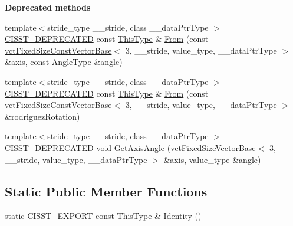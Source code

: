 \begin{Indent}{\bf Deprecated methods}\par
\begin{DoxyCompactItemize}
\item 
{\footnotesize template$<$stride\+\_\+type \+\_\+\+\_\+stride, class \+\_\+\+\_\+data\+Ptr\+Type $>$ }\\\hyperlink{cmn_portability_8h_a63da7164735f9501be651b1f2bbc0121}{C\+I\+S\+S\+T\+\_\+\+D\+E\+P\+R\+E\+C\+A\+T\+E\+D} const \hyperlink{classvct_quaternion_base_af28efdc38acf89acb7a67afada11408c}{This\+Type} \& \hyperlink{classvct_quaternion_rotation3_base_a2a79d881d43dd7b77a1e428d80060dba}{From} (const \hyperlink{classvct_fixed_size_const_vector_base}{vct\+Fixed\+Size\+Const\+Vector\+Base}$<$ 3, \+\_\+\+\_\+stride, value\+\_\+type, \+\_\+\+\_\+data\+Ptr\+Type $>$ \&axis, const Angle\+Type \&angle)
\item 
{\footnotesize template$<$stride\+\_\+type \+\_\+\+\_\+stride, class \+\_\+\+\_\+data\+Ptr\+Type $>$ }\\\hyperlink{cmn_portability_8h_a63da7164735f9501be651b1f2bbc0121}{C\+I\+S\+S\+T\+\_\+\+D\+E\+P\+R\+E\+C\+A\+T\+E\+D} const \hyperlink{classvct_quaternion_base_af28efdc38acf89acb7a67afada11408c}{This\+Type} \& \hyperlink{classvct_quaternion_rotation3_base_a2e5b033f5656aed1877476b90b332ecb}{From} (const \hyperlink{classvct_fixed_size_const_vector_base}{vct\+Fixed\+Size\+Const\+Vector\+Base}$<$ 3, \+\_\+\+\_\+stride, value\+\_\+type, \+\_\+\+\_\+data\+Ptr\+Type $>$ \&rodriguez\+Rotation)
\item 
{\footnotesize template$<$stride\+\_\+type \+\_\+\+\_\+stride, class \+\_\+\+\_\+data\+Ptr\+Type $>$ }\\\hyperlink{cmn_portability_8h_a63da7164735f9501be651b1f2bbc0121}{C\+I\+S\+S\+T\+\_\+\+D\+E\+P\+R\+E\+C\+A\+T\+E\+D} void \hyperlink{classvct_quaternion_rotation3_base_a7b6a4ed8830ee9153e9c387f5ea9a35a}{Get\+Axis\+Angle} (\hyperlink{classvct_fixed_size_vector_base}{vct\+Fixed\+Size\+Vector\+Base}$<$ 3, \+\_\+\+\_\+stride, value\+\_\+type, \+\_\+\+\_\+data\+Ptr\+Type $>$ \&axis, value\+\_\+type \&angle)
\end{DoxyCompactItemize}
\end{Indent}
\subsection*{Static Public Member Functions}
\begin{DoxyCompactItemize}
\item 
static \hyperlink{cmn_export_macros_8h_a99393e0c3ac434b2605235bbe20684f8}{C\+I\+S\+S\+T\+\_\+\+E\+X\+P\+O\+R\+T} const \hyperlink{classvct_quaternion_base_af28efdc38acf89acb7a67afada11408c}{This\+Type} \& \hyperlink{classvct_quaternion_rotation3_base_a9d08a3fdcfa011bd625af5e18f1e04d6}{Identity} ()
\end{DoxyCompactItemize}

